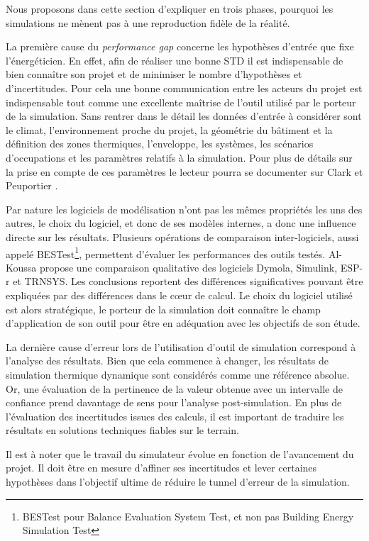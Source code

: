 Nous proposons dans cette section d'expliquer en trois phases, pourquoi les simulations ne mènent pas à une reproduction fidèle de la réalité.

La première cause du \textit{performance gap} concerne les hypothèses d'entrée que fixe l'énergéticien. En effet, afin de réaliser une bonne STD il est indispensable de bien connaître son projet et de minimiser le nombre d'hypothèses et d'incertitudes. Pour cela une bonne communication entre les acteurs du projet est indispensable tout comme une excellente maîtrise de l'outil utilisé par le porteur de la simulation. Sans rentrer dans le détail les données d'entrée à considérer sont le climat, l'environnement proche du projet, la géométrie du bâtiment et la définition des zones thermiques, l'enveloppe, les systèmes, les scénarios d'occupations et les paramètres relatifs à la simulation. Pour plus de détails sur la prise en compte de ces paramètres le lecteur pourra se documenter sur Clark \cite{Clarke-01} et Peuportier \cite{Peuportier-16}.

Par nature les logiciels de modélisation n'ont pas les mêmes propriétés les uns des autres, le choix du logiciel, et donc de ses modèles internes, a donc une influence directe sur les résultats. Plusieurs opérations de comparaison inter-logiciels, aussi appelé BESTest\footnote{BESTest pour Balance Evaluation System Test, et non pas Building Energy Simulation Test}, permettent d'évaluer les performances des outils testés. Al-Koussa \cite{AlKoussa-14} propose une comparaison qualitative des logiciels Dymola, Simulink, ESP-r et TRNSYS. Les conclusions reportent des différences significatives pouvant être expliquées par des différences dans le cœur de calcul. Le choix du logiciel utilisé est alors stratégique, le porteur de la simulation doit connaître le champ d'application de son outil pour être en adéquation avec les objectifs de son étude.

La dernière cause d'erreur lors de l'utilisation d'outil de simulation correspond à l'analyse des résultats. Bien que cela commence à changer, les résultats de simulation thermique dynamique sont considérés comme une référence absolue. Or, une évaluation de la pertinence de la valeur obtenue avec un intervalle de confiance prend davantage de sens pour l'analyse post-simulation. En plus de l'évaluation des incertitudes issues des calculs, il est important de traduire les résultats en solutions techniques fiables sur le terrain.

Il est à noter que le travail du simulateur évolue en fonction de l'avancement du projet. Il doit être en mesure d'affiner ses incertitudes et lever certaines hypothèses dans l'objectif ultime de réduire le tunnel d'erreur de la simulation.

